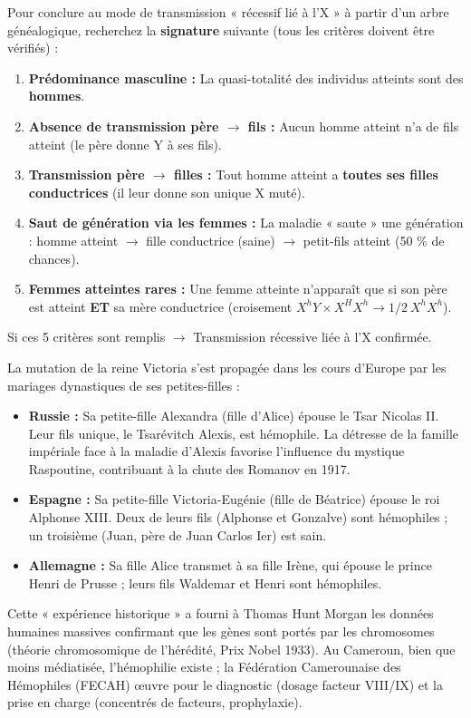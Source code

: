 \documentclass[11pt]{article}
\begin{document}
\begin{methode}
Pour conclure au mode de transmission « récessif lié à l'X » à partir d'un arbre généalogique, recherchez la \textbf{signature} suivante (tous les critères doivent être vérifiés) :
\begin{enumerate}
    \item \textbf{Prédominance masculine :} La quasi-totalité des individus atteints sont des \textbf{hommes}.
    \item \textbf{Absence de transmission père $\rightarrow$ fils :} Aucun homme atteint n'a de fils atteint (le père donne Y à ses fils).
    \item \textbf{Transmission père $\rightarrow$ filles :} Tout homme atteint a \textbf{toutes ses filles conductrices} (il leur donne son unique X muté).
    \item \textbf{Saut de génération via les femmes :} La maladie « saute » une génération : homme atteint $\rightarrow$ fille conductrice (saine) $\rightarrow$ petit-fils atteint (50 \% de chances).
    \item \textbf{Femmes atteintes rares :} Une femme atteinte n'apparaît que si son père est atteint \textbf{ET} sa mère conductrice (croisement $X^h Y \times X^H X^h \rightarrow 1/2\ X^h X^h$).
\end{enumerate}
Si ces 5 critères sont remplis $\rightarrow$ Transmission récessive liée à l'X confirmée.
\end{methode}

\begin{savaistu}
La mutation de la reine Victoria s'est propagée dans les cours d'Europe par les mariages dynastiques de ses petites-filles :
\begin{itemize}
    \item \textbf{Russie :} Sa petite-fille Alexandra (fille d'Alice) épouse le Tsar Nicolas II. Leur fils unique, le Tsarévitch Alexis, est hémophile. La détresse de la famille impériale face à la maladie d'Alexis favorise l'influence du mystique Raspoutine, contribuant à la chute des Romanov en 1917.
    \item \textbf{Espagne :} Sa petite-fille Victoria-Eugénie (fille de Béatrice) épouse le roi Alphonse XIII. Deux de leurs fils (Alphonse et Gonzalve) sont hémophiles ; un troisième (Juan, père de Juan Carlos Ier) est sain.
    \item \textbf{Allemagne :} Sa fille Alice transmet à sa fille Irène, qui épouse le prince Henri de Prusse ; leurs fils Waldemar et Henri sont hémophiles.
\end{itemize}
Cette « expérience historique » a fourni à Thomas Hunt Morgan les données humaines massives confirmant que les gènes sont portés par les chromosomes (théorie chromosomique de l'hérédité, Prix Nobel 1933). Au Cameroun, bien que moins médiatisée, l'hémophilie existe ; la Fédération Camerounaise des Hémophiles (FECAH) œuvre pour le diagnostic (dosage facteur VIII/IX) et la prise en charge (concentrés de facteurs, prophylaxie).
\end{savaistu}
\end{document}
